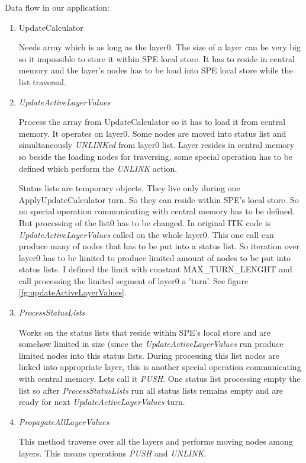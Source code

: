 Data flow in our application:
\begin{enumerate}
\item UpdateCalculator
\par
Needs array which is as long as the layer0.
The size of a layer can be very big so it impossible to store it within SPE local store.
It has to reside in central memory and the layer's nodes has to be load into SPE local store while the list traversal.

\item \emph{UpdateActiveLayerValues}
\par
Process the array from UpdateCalculator so it has to load it from central memory.
It operates on layer0.
Some nodes are moved into status list and simultaneously \emph{UNLINKed} from layer0 list.
Layer resides in central memory so beside the loading nodes for traversing, some special operation has to be defined which perform the \emph{UNLINK} action.
\par
Status lists are temporary objects. They live only during one ApplyUpdateCalculator turn.
So they can reside within SPE's local store.
So no special operation communicating with central memory has to be defined.
But processing of the list0 has to be changed.
In original ITK code is \emph{UpdateActiveLayerValues} called on the whole layer0.
This one call can produce many of nodes that has to be put into a status list.
So iteration over layer0 has to be limited to produce limited amount of nodes to be put into status lists.
I defined the limit with constant MAX\_TURN\_LENGHT and call processing the limited segment of layer0 a 'turn'.
See figure \ref{fg:updateActiveLayerValues}.

\item \emph{ProcessStatusLists}
\par
Works on the status lists that reside within SPE's local store and are somehow limited in size (since the \emph{UpdateActiveLayerValues} run produce limited nodes into this status lists.
During processing this list nodes are linked into appropriate layer, this is another special operation communicating with central memory.
Lets call it \emph{PUSH}.
One status list processing empty the list so after \emph{ProcessStatusLists} run all status lists remains empty and are ready for next \emph{UpdateActiveLayerValues} turn.

\item \emph{PropagateAllLayerValues}
\par
This method traverse over all the layers and performs moving nodes among layers.
This means operations \emph{PUSH} and \emph{UNLINK}.
\end{enumerate}

